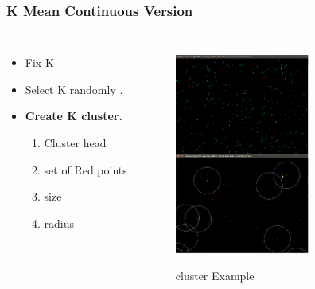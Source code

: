 \documentclass[blue]{beamer}
\begin{document}
\begin{frame}
\frametitle{K Mean Continuous Version}
\begin{columns}
 
 \begin{itemize}
  \item Fix K
  \item Select K randomly {\color{blue}{blue points}}.
  \item {\color{red}\textbf{{Create K cluster.}}}
    \begin{enumerate}
     \item Cluster head
     \item set of Red points
     \item size
     \item radius
    \end{enumerate}
\end{itemize}
 \begin{figure}[H]
     \caption{cluster Example }
           \scalebox{0.8}
          {\includegraphics[width=\linewidth ,height=2.6in]{cover15a.png}}
     \end{figure}
 \end{columns}    
{}
\end{frame}
\end{document}
